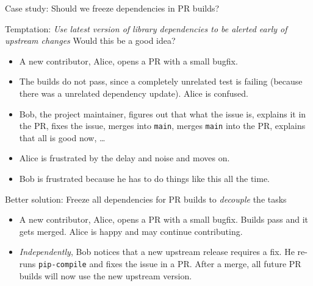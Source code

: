 \documentclass[english,aspectratio=1610,smaller]{beamer}
\newcommand{\scipp}{\texttt{scipp}\xspace}
\newcommand{\scippnexus}{\texttt{scippnexus}\xspace}
\begin{document}
\begin{frame}{Case study: Should we freeze dependencies in PR builds?}
  \begin{block}{Temptation: \emph{Use latest version of library dependencies to be alerted early of upstream changes}}
    Would this be a good idea?
    \pause
  \begin{itemize}[<+->]
    \item A new contributor, Alice, opens a PR with a small bugfix.
    \item The builds do not pass, since a completely unrelated test is failing (because there was a unrelated dependency update).
      Alice is confused.
    \item Bob, the project maintainer, figures out that what the issue is, explains it in the PR, fixes the issue, merges into \texttt{main}, merges \texttt{main} into the PR, explains that all is good now, \dots
    \item Alice is frustrated by the delay and noise and moves on.
    \item Bob is frustrated because he has to do things like this all the time.
  \end{itemize}
  \end{block}
  \pause
  \begin{block}{Better solution: Freeze all dependencies for PR builds to \emph{decouple} the tasks}
    \begin{itemize}
      \item A new contributor, Alice, opens a PR with a small bugfix. Builds pass and it gets merged. Alice is happy and may continue contributing.
      \item \emph{Independently}, Bob notices that a new upstream release requires a fix.
        He re-runs \texttt{pip-compile} and fixes the issue in a PR.
        After a merge, all future PR builds will now use the new upstream version.
    \end{itemize}
  \end{block}
\end{frame}
\end{document}
